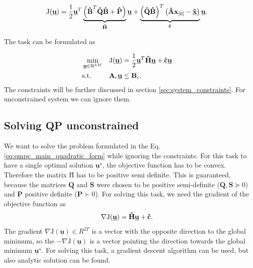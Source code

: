 \documentclass[a4paper,11pt,titlepage]{article}
\newcommand{\uvec}{\textbf{\underline{u}}}
\newcommand{\macJ}{\mathrm{J}(\uvec)}
\begin{document}
\begin{equation}
\mathrm{J}(\underline{\textbf{u}}) = \frac{1}{2}\uvec^T\underbrace{\left(\textbf{\^B}^T\textbf{\^Q}\textbf{\^B} + \textbf{\^P}\right)}_{\textbf{\^H}}\uvec + \underbrace{\left(\textbf{\^Q}\textbf{\^B}\right)^T\left(\textbf{\^A}\textbf{x}_{[0]} - \textbf{\underline{\~x}}\right)}_{\textbf{\^c}}\uvec.
\label{eq:mpc_objective_large}
\end{equation}

The task can be formulated as

\begin{equation}
\label{eq:qmpc_main_quadratic_form}
\begin{aligned}
& \min_{\uvec \in \mathrm{R}^{kM}}
& & \mathrm{J}(\uvec) = \frac{1}{2}\uvec^T\textbf{\^H}\uvec + \textbf{\^c} \uvec\\
& \text{s.t.}
& & \textbf{A}_c \uvec \leq \textbf{B}_c.
\end{aligned}
\end{equation}
The constraints will be further discussed in section \ref{sec:system_constraints}. For unconstrained system we can ignore them.

\subsection{Solving QP unconstrained}
We want to solve the problem formulated in the Eq. \ref{eq:qmpc_main_quadratic_form} while ignoring the constraints. For this task to have a single optimal solution $\underline{\textbf{u}}^{\star}$, the objective function has to be convex. Therefore the matrix $\textbf{\^H}$ has to be positive semi definite. This is guaranteed, because the matrices  $\textbf{Q}$ and $\textbf{S}$ were chosen to be positive semi-definite ($\textbf{Q}, \textbf{S} \succeq 0$) and $\textbf{P}$ positive definite ($\textbf{P} \succ 0$). For solving this task, we need the gradient of the objective function \cite{zometa2012implementation} as
\begin{equation}
\label{eq:J_grad}
\nabla\macJ = \textbf{\^H}\uvec + \textbf{\^c}.
\end{equation}
The gradient $\nabla\mathrm{J}(\underline{\textbf{u}}) \in R^{2T}$ is a vector with the opposite direction to the global minimum, so the $-\nabla\mathrm{J}(\underline{\textbf{u}})$ is a vector pointing the direction towards the global minimum $\underline{\textbf{u}}^{\star}$. For solving this task, a gradient descent algorithm can be used, but also analytic solution can be found.  
\end{document}
